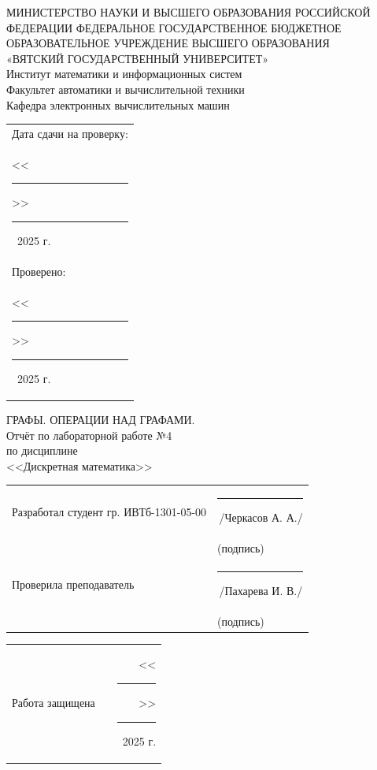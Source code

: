 \documentclass[oneside,a4paper,14pt]{extarticle}
\begin{document}
\newpage
\thispagestyle{empty}
\begin{center}
	МИНИСТЕРСТВО НАУКИ И ВЫСШЕГО ОБРАЗОВАНИЯ РОССИЙСКОЙ ФЕДЕРАЦИИ ФЕДЕРАЛЬНОЕ ГОСУДАРСТВЕННОЕ БЮДЖЕТНОЕ ОБРАЗОВАТЕЛЬНОЕ УЧРЕЖДЕНИЕ ВЫСШЕГО ОБРАЗОВАНИЯ\\
	«ВЯТСКИЙ ГОСУДАРСТВЕННЫЙ УНИВЕРСИТЕТ»\\
	Институт математики и информационных систем\\
	Факультет автоматики и вычислительной техники\\
	Кафедра электронных вычислительных машин
\end{center}
\vspace{10mm}

\hfill
\begin{tabular}{l}
  \footnotesize Дата сдачи на проверку: \\
  \footnotesize <<\rule[-1mm]{5mm}{0.10mm}\/>>\rule[-1mm]{20mm}{0.10mm}\ 2025 г.\\
  \footnotesize Проверено: \\
  \footnotesize <<\rule[-1mm]{5mm}{0.10mm}\/>>\rule[-1mm]{20mm}{0.10mm}\ 2025 г. \\
\end{tabular}
\vfill

\begin{center}
  ГРАФЫ. ОПЕРАЦИИ НАД ГРАФАМИ.\\
	Отчёт по лабораторной работе №4\\
	по дисциплине\\
	<<Дискретная математика>>\\
\end{center}
\vspace{25mm}
\noindent
\begin{tabular}{ll}
	Разработал студент гр. ИВТб-1301-05-00 & \rule[-1mm]{30mm}{0.10mm}\,/Черкасов А. А./   \\
	                                       & \hspace{8mm}\footnotesize(подпись)            \\
	Проверила преподаватель                & \rule[-1mm]{30mm}{0.10mm}\,/Пахарева И. В./ \\
	                                       & \hspace{8mm}\footnotesize(подпись)            \\
\end{tabular}

\noindent
  \begin{tabular}{lp{58mm}r}
    Работа защищена &  & <<\rule[-1mm]{5mm}{0.10mm}\/>>\rule[-1mm]{30mm}{0.10mm}\ 2025 г.
  \end{tabular}
  \vfill
\end{document}
